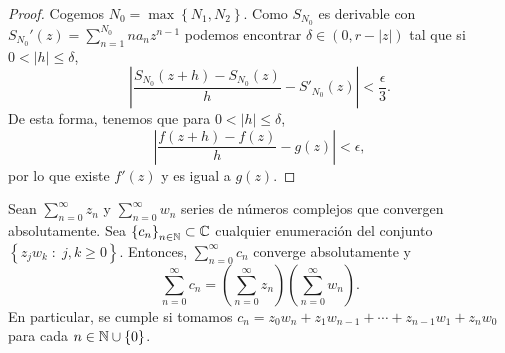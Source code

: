 \begin{proof}
Cogemos $\displaystyle N_{0}=\max \left\{ N_{1}, N_{2}\right\}  $. Como $\displaystyle S_{N_{0}} $ es derivable con $\displaystyle S_{N_{0}}'\left(z\right)=\sum^{N_{0}}_{n = 1}na_{n}z^{n-1} $ podemos encontrar $\displaystyle \delta \in \left(0, r - \left|z\right|\right) $ tal que si $\displaystyle 0 < \left|h\right| \leq \delta  $,
\[ \left|\frac{S_{N_{0}}\left(z+h\right)-S_{N_{0}}\left(z\right)}{h}-S'_{N_{0}}\left(z\right)\right|< \frac{\epsilon }{3} .\]
De esta forma, tenemos que para $\displaystyle 0 < \left|h\right|\leq \delta  $,
\[ \left|\frac{f\left(z + h\right)-f\left(z\right)}{h}-g\left(z\right)\right|<\epsilon ,\]
por lo que existe $\displaystyle f'\left(z\right) $ y es igual a $\displaystyle g\left(z\right) $. 
\end{proof}
\begin{theorem}
	Sean $\displaystyle \sum^{\infty}_{n = 0}z_{n} $ y $\displaystyle \sum^{\infty}_{n = 0}w_{n} $ series de números complejos que convergen absolutamente. Sea $\displaystyle \left\{ c_{n}\right\} _{n\in\mathbb{N}}\subset \mathbb{C} $ cualquier enumeración del conjunto $\displaystyle \left\{ z_{j}w_{k} \; : \; j,k \geq 0\right\}  $. Entonces, $\displaystyle \sum^{\infty}_{n = 0}c_{n} $ converge absolutamente y
	\[\sum^{\infty}_{n = 0}c_{n}=\left(\sum^{\infty}_{n = 0}z_{n}\right)\left(\sum^{\infty}_{n = 0}w_{n}\right) .\]
	En particular, se cumple si tomamos $\displaystyle c_{n}=z_{0}w_{n} + z_{1} w_{n-1} + \cdots + z_{n-1}w_{1} + z_{n}w_{0} $ para cada $\displaystyle n \in \mathbb{N} \cup \left\{ 0\right\}  $. 
\end{theorem}
